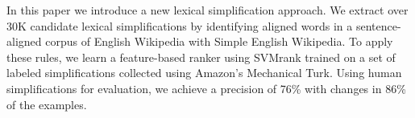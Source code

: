 In this paper we introduce a new lexical simplification approach.  We extract over 30K candidate lexical simplifications by identifying aligned words in a sentence-aligned corpus of English Wikipedia with Simple English Wikipedia.  To apply these rules, we learn a feature-based ranker using SVMrank trained on a set of labeled simplifications collected using Amazon's Mechanical Turk.  Using human simplifications for evaluation, we achieve a precision of 76\% with changes in 86\% of the examples.
